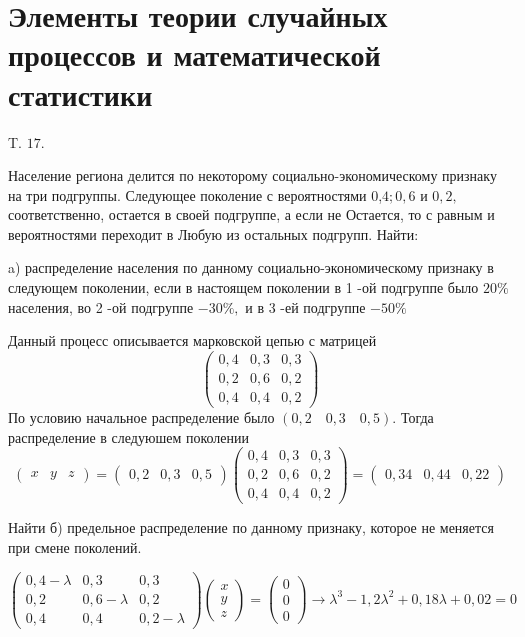 \documentclass[a4paper,12pt]{article} %
\begin{document}
\section{Элементы теории случайных процессов и математической статистики}




\begin{example} T. $17 .$ 

Население региона делится по некоторому социально-экономическому признаку на три подгруппы. Следующее поколение с вероятностями 0,$4 ; 0,6$ и $0,2,$ соответственно, остается в своей подгруппе, а если не
Остается, то с равным и вероятностями переходит в Любую из остальных подгрупп. Найти:

a) распределение населения по данному социально-экономическому 
признаку в следующем поколении, если в настоящем поколении в 1 -ой подгруппе было $20 \%$ населения, во 2 -ой подгруппе $-30 \%,$ и в 3 -ей подгруппе $-50 \%$




Данный процесс описывается марковской цепью с матрицей
$$
\left(\begin{array}{lll}
0,4 & 0,3 & 0,3 \\
0,2 & 0,6 & 0,2 \\
0,4 & 0,4 & 0,2
\end{array}\right)
$$
По условию начальное распределение было $(0,2 \quad 0,3 \quad 0,5)$. Тогда распределение в следуюшем поколении
$$
\left(\begin{array}{lllll}
x & y & z
\end{array}\right)=\left(\begin{array}{lll}
0,2 & 0,3 & 0,5
\end{array}\right)\left(\begin{array}{lll}
0,4 & 0,3 & 0,3 \\
0,2 & 0,6 & 0,2 \\
0,4 & 0,4 & 0,2
\end{array}\right)=\left(\begin{array}{lll}
0,34 & 0,44 & 0,22
\end{array}\right)
$$



Найти б) предельное распределение по данному признаку, которое не меняется при смене поколений.





$$
\left(\begin{array}{ccc}
0,4-\lambda & 0,3 & 0,3 \\
0,2 & 0,6-\lambda & 0,2 \\
0,4 & 0,4 & 0,2-\lambda
\end{array}\right)\left(\begin{array}{l}
x \\
y \\
z
\end{array}\right)=\left(\begin{array}{l}
0 \\
0 \\
0
\end{array}\right) \rightarrow \lambda^{3}-1,2 \lambda^{2}+0,18 \lambda+0,02=0
$$




\end{example}
\end{document}
